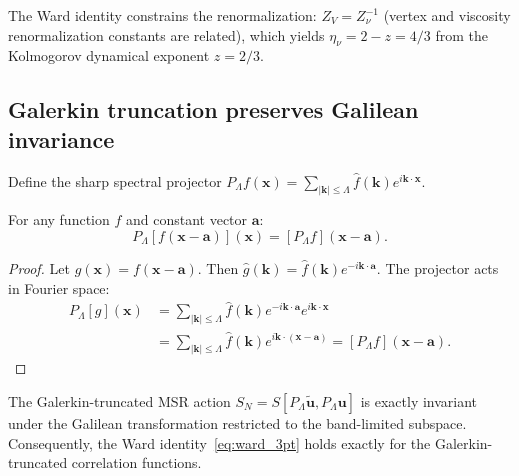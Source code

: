 The Ward identity constrains the renormalization: $Z_V = Z_\nu^{-1}$ (vertex and viscosity renormalization constants are related), which yields $\eta_\nu = 2 - z = 4/3$ from the Kolmogorov dynamical exponent $z = 2/3$.

\subsection{Galerkin truncation preserves Galilean invariance\label{app:ward_galerkin}}

Define the sharp spectral projector $P_\Lambda f(\mathbf{x}) = \sum_{|\mathbf{k}|\leq\Lambda}\hat{f}(\mathbf{k})e^{i\mathbf{k}\cdot\mathbf{x}}$.

\begin{lemma}\label{lem:commute}
For any function $f$ and constant vector $\mathbf{a}$:
\begin{equation}
P_\Lambda[f(\mathbf{x}-\mathbf{a})](\mathbf{x}) = [P_\Lambda f](\mathbf{x}-\mathbf{a}).
\end{equation}
\end{lemma}

\begin{proof}
Let $g(\mathbf{x}) = f(\mathbf{x}-\mathbf{a})$. Then $\hat{g}(\mathbf{k}) = \hat{f}(\mathbf{k})e^{-i\mathbf{k}\cdot\mathbf{a}}$. The projector acts in Fourier space:
\begin{equation}
\begin{aligned}
P_\Lambda[g](\mathbf{x}) &= \sum_{|\mathbf{k}|\leq\Lambda}\hat{f}(\mathbf{k})e^{-i\mathbf{k}\cdot\mathbf{a}}e^{i\mathbf{k}\cdot\mathbf{x}} \\
&= \sum_{|\mathbf{k}|\leq\Lambda}\hat{f}(\mathbf{k})e^{i\mathbf{k}\cdot(\mathbf{x}-\mathbf{a})} = [P_\Lambda f](\mathbf{x}-\mathbf{a}).
\end{aligned}
\end{equation}
\end{proof}

\begin{theorem}\label{thm:galerkin_ward}
The Galerkin-truncated MSR action $S_N = S[P_\Lambda\tilde{\mathbf{u}},P_\Lambda\mathbf{u}]$ is exactly invariant under the Galilean transformation restricted to the band-limited subspace. Consequently, the Ward identity~\eqref{eq:ward_3pt} holds exactly for the Galerkin-truncated correlation functions.
\end{theorem}

